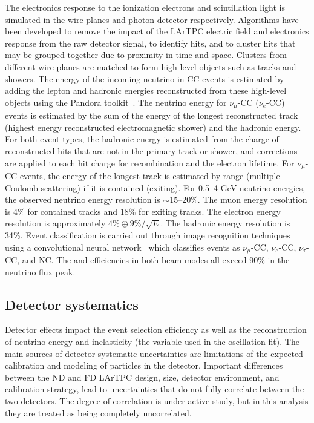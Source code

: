 The electronics response to the ionization electrons and scintillation light is simulated in the wire planes and photon detector respectively. Algorithms have been developed to remove the impact of the LArTPC electric field and electronics response from the raw detector signal, to identify hits, and to cluster hits that may be grouped together due to proximity in time and space. Clusters from different wire planes are matched to form high-level objects such as tracks and showers. The energy of the incoming neutrino in CC events is estimated by adding the lepton and hadronic energies reconstructed from these high-level objects using the Pandora toolkit~\cite{Marshall:2015rfa,Acciarri:2017hat}. The neutrino energy for $\nu_{\mu}$-CC ($\nu_{e}$-CC) events is estimated by the sum of the energy of the longest reconstructed track (highest energy reconstructed electromagnetic shower) and the hadronic energy. For both event types, the hadronic energy is estimated from the charge of reconstructed hits that are not in the primary track or shower, and corrections are applied to each hit charge for recombination and the electron lifetime. For $\nu_{\mu}$-CC events, the energy of the longest track is estimated by range (multiple Coulomb scattering) if it is contained (exiting). For 0.5--4 GeV neutrino energies, the observed neutrino energy resolution is $\sim$15--20\%. The muon energy resolution is 4\% for contained tracks and 18\% for exiting tracks. The electron energy resolution is approximately $4\% \oplus 9\%/\sqrt{E}$. The hadronic energy resolution is 34\%. Event classification is carried out through image recognition techniques using a convolutional neural network~\cite{cvn_paper} which classifies events as $\nu_{\mu}$-CC, $\nu_{e}$-CC, $\nu_{\tau}$-CC, and NC. The \nue and \numu efficiencies in both beam modes all exceed 90\% in the neutrino flux peak.

\subsection{Detector systematics}
Detector effects impact the event selection efficiency as well as the reconstruction of neutrino energy and inelasticity (the variable used in the oscillation fit). The main sources of detector systematic uncertainties are limitations of the expected calibration and modeling of particles in the detector. Important differences between the ND and FD LArTPC design, size, detector environment, and calibration strategy, lead to uncertainties that do not fully correlate between the two detectors. The degree of correlation is under active study, but in this analysis they are treated as being completely uncorrelated.

